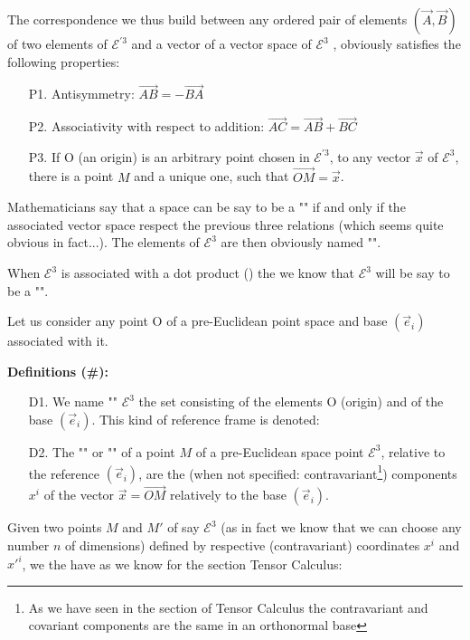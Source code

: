 	The correspondence we thus build between any ordered pair of elements $(\vec{A}, \vec{B})$ of two elements of $\mathcal{E}^{'3}$ and a vector of a vector space of $\mathcal{E}^{3}$ , obviously satisfies the following properties:
	\begin{enumerate}
		\item[P1.] Antisymmetry: $\overrightarrow{AB}=-\overrightarrow{BA}$

		\item[P2.] Associativity with respect to addition: $\overrightarrow{AC}=\overrightarrow{AB}+\overrightarrow{BC}$

		\item[P3.] If O (an origin) is an arbitrary point chosen in $\mathcal{E}^{'3}$, to any vector $\vec{x}$ of $\mathcal{E}^{3}$, there is a point $M$ and a unique one, such that $\overrightarrow{OM}=\vec{x}$.
	\end{enumerate}
	Mathematicians say that a space can be say to be a "" if and only if the associated vector space respect the previous three relations (which seems quite obvious in fact...). The elements of $\mathcal{E}^3$ are then obviously named "".
	
	When $\mathcal{E}^3$ is associated with a dot product () the we know that $\mathcal{E}^3$ will be say to be a "".

	Let us consider any point O of a pre-Euclidean point space and base $(\vec{e}_i)$ associated with it.
	
	\textbf{Definitions (\#\mydef):}
	\begin{enumerate}
		\item[D1.] We name "" $\mathcal{E}^3$ the set consisting of the elements O (origin) and of the base $(\vec{e}_i)$. This kind of reference frame is denoted:
	

		\item[D2.] The "" or "" of a point $M$ of a pre-Euclidean space point $\mathcal{E}^3$, relative to the reference $(\vec{e}_i)$, are the (when not specified: contravariant\footnote{As we have seen in the section of Tensor Calculus the contravariant and covariant components are the same in an orthonormal base}) components $x^i$ of the vector $\vec{x}=\overrightarrow{OM}$ relatively to the base $(\vec{e}_i)$.
	\end{enumerate}
	Given two points $M$ and $M'$ of say $\mathcal{E}^3$ (as in fact we know that we can choose any number $n$ of dimensions) defined by respective (contravariant) coordinates $x^i$ and ${x'}^{i}$, we the have as we know for the section Tensor Calculus:
	
